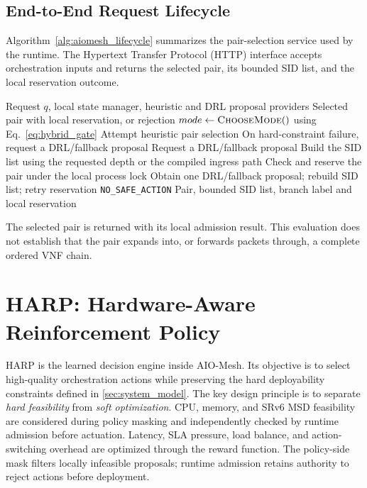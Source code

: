 \documentclass[final,5p]{elsarticle}
\newcommand{\rev}[1]{\textcolor{revisiongreen}{#1}}
\let\newrev\rev
\begin{document}
\subsection{End-to-End Request Lifecycle}
\label{subsec:request_lifecycle}
\newrev{Algorithm~\ref{alg:aiomesh_lifecycle} summarizes the pair-selection service used by the runtime. The Hypertext Transfer Protocol (HTTP) interface accepts orchestration inputs and returns the selected pair, its bounded SID list, and the local reservation outcome.}

\begin{algorithm}[t]
\caption{Local pair-selection and reservation service}
\label{alg:aiomesh_lifecycle}
\small
\begin{algorithmic}[1]
\Require Request \(q\), local state manager, heuristic and DRL proposal providers
\Ensure Selected pair with local reservation, or rejection
\State \(mode\gets\textsc{ChooseMode}()\) using Eq.~\eqref{eq:hybrid_gate}
    \State Attempt heuristic pair selection
    \State On hard-constraint failure, request a DRL/fallback proposal
\Else
    \State Request a DRL/fallback proposal
\EndIf
\State \newrev{Build the SID list using the requested depth or the compiled ingress path}
\State Check and reserve the pair under the local process lock
    \State Obtain one DRL/fallback proposal; rebuild SID list; retry reservation
\EndIf
{}
    \State \Return \texttt{NO\_SAFE\_ACTION}
\EndIf
\State \Return Pair, bounded SID list, branch label and local reservation
\end{algorithmic}
\end{algorithm}

\newrev{The selected pair is returned with its local admission result. This evaluation does not establish that the pair expands into, or forwards packets through, a complete ordered VNF chain.}

\section{HARP: Hardware-Aware Reinforcement Policy}
\label{sec:harp}

HARP is the learned decision engine inside AIO-Mesh. Its objective is to select high-quality orchestration actions while preserving the hard deployability constraints defined in \autoref{sec:system_model}. The key design principle is to separate \emph{hard feasibility} from \emph{soft optimization}. CPU, memory, and SRv6 MSD feasibility are \rev{considered during policy masking and independently checked by runtime admission} before actuation. Latency, SLA pressure, load balance, and \rev{action-switching overhead} are optimized through the reward function. \rev{The policy-side mask filters locally infeasible proposals; runtime admission retains authority to reject actions before deployment.}
\end{document}
